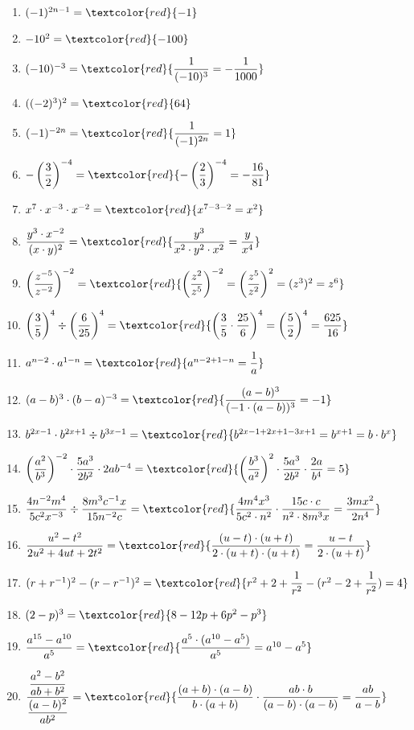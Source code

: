 \documentclass[11pt, a4paper, twoside, fleqn]{article}
\begin{document}
\begin{enumerate}[itemsep=3ex]
\item $ (-1)^{2n -1} = \textcolor{red}{-1} $
\item $ -10^{2} = \textcolor{red}{-100} $
\item $ (-10)^{-3} = \textcolor{red}{\dfrac{1}{(-10)^{3}} = -\dfrac{1}{1000}} $
\item $((-2)^{3})^{2} = \textcolor{red}{64} $
\item $ (-1)^{-2n} = \textcolor{red}{\dfrac{1}{(-1)^{2n}} = 1} $
\item $ -\left(\dfrac{3}{2}\right)^{-4} = \textcolor{red}{-\left(\dfrac{2}{3}\right)^{-4} = -\dfrac{16}{81}} $
\item $ x^7 \cdot x^{-3} \cdot x^{-2} = \textcolor{red}{x^{7-3-2} = x^{2}} $
\item $ \dfrac{y^{3} \cdot x^{-2}}{(x \cdot y)^2} =  \textcolor{red}{\dfrac{y^3}{x^{2}\cdot y^{2} \cdot x^{2}} = \dfrac{y}{x^4}} $
\item $ \left(\dfrac{z^{-5}}{z^{-2}}\right)^{-2} = \textcolor{red}{\left(\dfrac{z^{2}}{z^{5}}\right)^{-2} = \left(\dfrac{z^{5}}{z^{2}} \right)^{2} = (z^3)^2 = z^6} $
\item $ \left(\dfrac{3}{5}\right)^4 \div \left(\dfrac{6}{25}\right)^{4} = \textcolor{red}{\left(\dfrac{3}{5} \cdot \dfrac{25}{6} \right)^{4} = \left (\dfrac{5}{2}\right)^{4} = \dfrac{625}{16}} $ 
\item $ a^{n-2} \cdot a^{1-n} =\textcolor{red}{a^{n-2+1-n} = \dfrac{1}{a}} $
\item $ (a-b)^{3} \cdot (b-a)^{-3} = \textcolor{red}{\dfrac{(a-b)^3}{(-1 \cdot(a-b))^{3}}= -1} $
\item $ b^{2x-1} \cdot b^{2x+1} \div b^{3x-1} = \textcolor{red}{b^{2x-1+2x+1-3x+1} = b^{x+1} = b \cdot b^{x}} $
\item $ \left(\dfrac{a^{2}}{b^{3}} \right)^{-2} \cdot \dfrac{5a^{3}}{2b^{2}} \cdot 2ab^{-4} = \textcolor{red}{\left(\dfrac{b^{3}}{a^2}\right)^{2} \cdot \dfrac{5a^3}{2b^2} \cdot \dfrac{2a}{b^{4}} = 5} $
\item $ \dfrac{4n^{-2} m^{4}}{5c^{2} x^{-3}} \div \dfrac{8m^{3}c^{-1}x}{15n^{-2}c} =\textcolor{red}{\dfrac{4m^{4}x^{3}}{5c^{2} \cdot n^{2}} \cdot \dfrac{15c \cdot c }{n^{2} \cdot 8m^{3}x} = \dfrac{3mx^{2}}{2n^{4}}} $
\item $ \dfrac{u^{2} - t^{2}}{2u^{2} + 4ut + 2t^{2}} = \textcolor{red}{\dfrac{(u-t) \cdot (u+t)}{2 \cdot (u+t) \cdot (u+t)} = \dfrac{u-t}{2 \cdot (u+t)}} $
\item $ (r+r^{-1})^2 - (r-r^{-1})^2 = \textcolor{red}{r^{2} + 2 + \dfrac{1}{r^{2}} - (r^{2} -2 + \dfrac{1}{r^{2}}) = 4} $
\item $ (2-p)^{3} = \textcolor{red}{8-12p+6p^{2}-p^3} $
\item $ \dfrac{a^{15} - a^{10}} {a^{5}} = \textcolor{red}{\dfrac{a^{5} \cdot (a^{10} - a^{5})}{a^{5}} = a^{10} - a^{5}} $
\item $ \dfrac{\dfrac{a^{2} - b^{2}}{ab + b^{2}}}{\dfrac{(a-b)^{2}}{ab^{2}}} = \textcolor{red}{\dfrac{(a+b) \cdot (a-b)}{b \cdot (a+b)} \cdot \dfrac{ab \cdot b}{(a-b) \cdot (a-b)} = \dfrac{ab}{a-b}}$ 
\end{enumerate}
\end{document}

